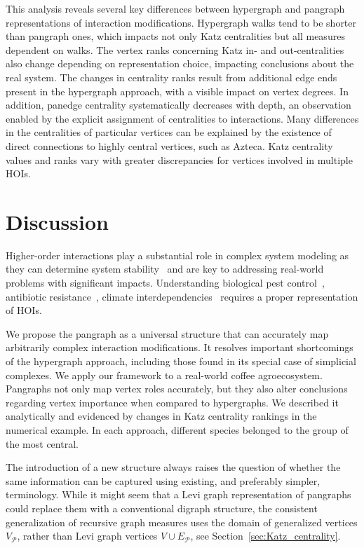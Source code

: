 \documentclass[a4paper,12pt]{article}
\theoremstyle{definition}
\theoremstyle{remark}
\newcommand{\mP}{\mathcal{P}}
\begin{document}
This analysis reveals several key differences between hypergraph and pangraph representations of interaction modifications. Hypergraph walks tend to be shorter than pangraph ones, which impacts not only Katz centralities but all measures dependent on walks. The vertex ranks concerning Katz in- and out-centralities also change depending on representation choice, impacting conclusions about the real system. The changes in centrality ranks result from additional edge ends present in the hypergraph approach, with a visible impact on vertex degrees. In addition, panedge centrality systematically decreases with depth, an observation enabled by the explicit assignment of centralities to interactions. Many differences in the centralities of particular vertices can be explained by the existence of direct connections to highly central vertices, such as Azteca. Katz centrality values and ranks vary with greater discrepancies for vertices involved in multiple HOIs.

\section{Discussion}\label{sec:discussion}

Higher-order interactions play a substantial role in complex system modeling as they can determine system stability~\cite{Grilli2017} and are key to addressing real-world problems with significant impacts. Understanding biological pest control~\cite{Vandermeer_2010, Perfecto_coffe_agroeco, GOLUBSKI2016344}, antibiotic resistance~\cite{bac_34_reading1977clavulanic, bac_31_kelsic2015counteraction, bac_32_perlin2009protection, bac_33_abrudan2015socially}, climate interdependencies~\cite{40_climate_Boers_2019, 41_climate_Su_2021} requires a proper representation of HOIs.

We propose the pangraph as a universal structure that can accurately map arbitrarily complex interaction modifications. It resolves important shortcomings of the hypergraph approach, including those found in its special case of simplicial complexes. We apply our framework to a real-world coffee agroecosystem. Pangraphs not only map vertex roles accurately, but they also alter conclusions regarding vertex importance when compared to hypergraphs. We described it analytically and evidenced by changes in Katz centrality rankings in the numerical example. In each approach, different species belonged to the group of the most central.

The introduction of a new structure always raises the question of whether the same information can be captured using existing, and preferably simpler, terminology. While it might seem that a Levi graph representation of pangraphs could replace them with a conventional digraph structure, the consistent generalization of recursive graph measures uses the domain of generalized vertices $V_{\mP}$, rather than Levi graph vertices $V\cup E_{\mP}$, see Section~\ref{sec:Katz_centrality}.
\end{document}
